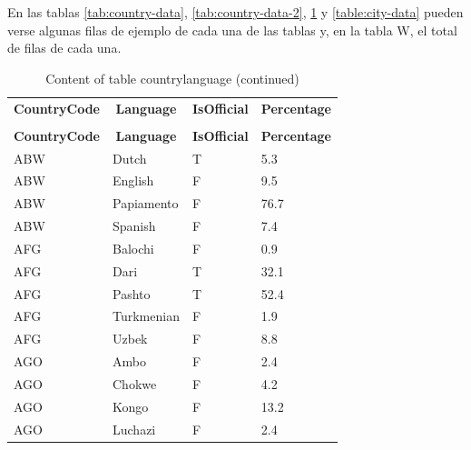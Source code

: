 En las tablas \ref{tab:country-data}, \ref{tab:country-data-2}, \ref{table:countrylanguage-data} y \ref{table:city-data} pueden verse algunas filas de ejemplo de cada una de las tablas y, en la tabla W, el total de filas de cada una.

%
%
 \begin{longtable}{|l|l|l|l|}
 \hline \endhead \hline \endfoot \hline
 \caption{Algunas filas de la tabla CountryLanguage} \label{table:countrylanguage-data} \\\hline \multicolumn{1}{|c|}{\textbf{CountryCode}} & \multicolumn{1}{|c|}{\textbf{Language}} & \multicolumn{1}{|c|}{\textbf{IsOfficial}} & \multicolumn{1}{|c|}{\textbf{Percentage}} \\ \hline \hline  \endfirsthead
\caption{Content of table countrylanguage (continued)} \\ \hline \multicolumn{1}{|c|}{\textbf{CountryCode}} & \multicolumn{1}{|c|}{\textbf{Language}} & \multicolumn{1}{|c|}{\textbf{IsOfficial}} & \multicolumn{1}{|c|}{\textbf{Percentage}} \\ \hline \hline \endhead \endfoot
ABW & Dutch & T & 5.3 \\ \hline
ABW & English & F & 9.5 \\ \hline
ABW & Papiamento & F & 76.7 \\ \hline
ABW & Spanish & F & 7.4 \\ \hline
AFG & Balochi & F & 0.9 \\ \hline
AFG & Dari & T & 32.1 \\ \hline
AFG & Pashto & T & 52.4 \\ \hline
AFG & Turkmenian & F & 1.9 \\ \hline
AFG & Uzbek & F & 8.8 \\ \hline
AGO & Ambo & F & 2.4 \\ \hline
AGO & Chokwe & F & 4.2 \\ \hline
AGO & Kongo & F & 13.2 \\ \hline
AGO & Luchazi & F & 2.4 \\ \hline
 \end{longtable}


